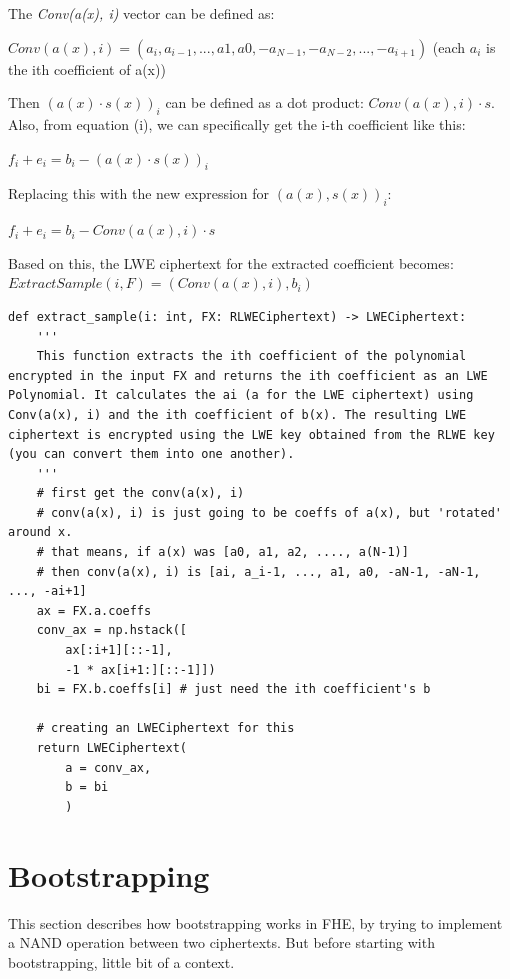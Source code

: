 \documentclass{report}
\begin{document}
The \textit{Conv(a(x), i)} vector can be defined as:
\begin{center}
	$ Conv(a(x), i) = (a_i, a_{i-1}, ..., a1, a0, -a_{N-1}, -a_{N-2}, ..., -a_{i+1})$ (each $a_i$ is the ith coefficient of a(x))
\end{center}

Then $(a(x) \cdot s(x))_i$ can be defined as a dot product: $Conv(a(x), i) \cdot s$. Also, from equation (i), we can specifically get the i-th coefficient like this:
\begin{center}
	$f_i + e_i = b_i - (a(x) \cdot s(x))_i$
\end{center}
Replacing this with the new expression for $(a(x), s(x))_i$:
\begin{center}
	$f_i + e_i = b_i - Conv(a(x), i) \cdot s$
\end{center}
Based on this, the LWE ciphertext for the extracted coefficient becomes: $ExtractSample(i, F) = ( Conv(a(x), i) , b_i)$
\begin{verbatim}
def extract_sample(i: int, FX: RLWECiphertext) -> LWECiphertext:
	'''
	This function extracts the ith coefficient of the polynomial encrypted in the input FX and returns the ith coefficient as an LWE Polynomial. It calculates the ai (a for the LWE ciphertext) using Conv(a(x), i) and the ith coefficient of b(x). The resulting LWE ciphertext is encrypted using the LWE key obtained from the RLWE key (you can convert them into one another).
	'''
	# first get the conv(a(x), i)
	# conv(a(x), i) is just going to be coeffs of a(x), but 'rotated' around x.
	# that means, if a(x) was [a0, a1, a2, ...., a(N-1)]
	# then conv(a(x), i) is [ai, a_i-1, ..., a1, a0, -aN-1, -aN-1, ..., -ai+1]
	ax = FX.a.coeffs
	conv_ax = np.hstack([
		ax[:i+1][::-1],
		-1 * ax[i+1:][::-1]])
	bi = FX.b.coeffs[i] # just need the ith coefficient's b
	
	# creating an LWECiphertext for this
	return LWECiphertext(
		a = conv_ax,
		b = bi
		)
\end{verbatim}

\chapter{Bootstrapping}
This section describes how bootstrapping works in FHE, by trying to implement a NAND operation between two ciphertexts. But before starting with bootstrapping, little bit of a context.
\end{document}
